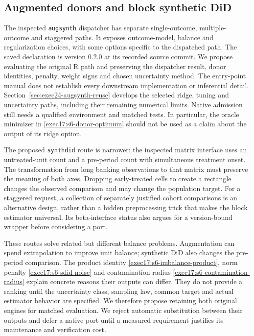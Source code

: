\subsection{Augmented donors and block synthetic DiD}

The inspected \texttt{augsynth} dispatcher has separate single-outcome,
multiple-outcome and staggered paths. It exposes outcome-model,
balance and regularization choices, with some options specific to
the dispatched path. The saved declaration is version 0.2.0 at its
recorded source commit. We propose evaluating the original R path
and preserving the dispatcher result, donor identities, penalty,
weight signs and chosen uncertainty method. The entry-point manual
does not establish every downstream implementation or inferential
detail. Section~\ref{sec:exec24-augsynth-reuse} develops the selected ridge,
tuning and uncertainty paths, including their remaining numerical limits.
Native admission still needs a qualified environment and matched tests.
In particular, the oracle minimizer in \eqref{exec17:s6-donor-optimum}
should not be used as a claim about the output of its ridge option.
\citep{v12_sw_augsynth,exec17_s6_paths}

The proposed \texttt{synthdid} route is narrower: the inspected
matrix interface uses an untreated-unit count and a pre-period
count with simultaneous treatment onset. The transformation from
long banking observations to that matrix must preserve the meaning
of both axes. Dropping early-treated cells to create a rectangle
changes the observed comparison and may change the population
target. For a staggered request, a collection of separately justified
cohort comparisons is an alternative design, rather than a hidden
preprocessing trick that makes the block estimator universal.
Its beta-interface status also argues for a version-bound wrapper
before considering a port.~\citep{sw_synthdid}

These routes solve related but different balance problems. Augmentation
can spend extrapolation to improve unit balance; synthetic DiD also
changes the pre-period comparison. The product identity
\eqref{exec17:s6-imbalance-product}, norm penalty
\eqref{exec17:s6-sdid-noise} and contamination radius
\eqref{exec17:s6-contamination-radius} explain concrete reasons their
outputs can differ. They do not provide a ranking until the uncertainty
class, sampling law, common target and actual estimator behavior are
specified. We therefore propose retaining both original engines for
matched evaluation. We reject automatic substitution between their
outputs and defer a native port until a measured requirement justifies
its maintenance and verification cost.

